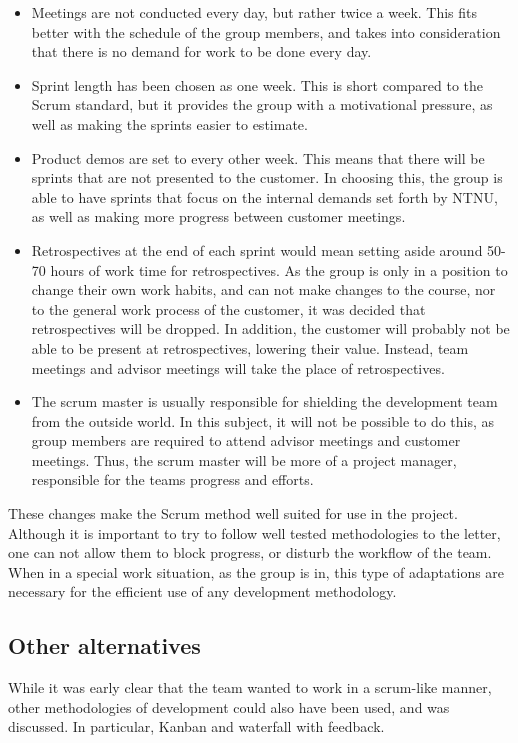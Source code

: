 \documentclass[11pt,a4paper,titlepage,oneside]{report}
\begin{document}
\begin{itemize}
\item Meetings are not conducted every day, but rather twice a week. This fits better with the schedule of the group members, and takes into consideration that there is no demand for work to be done every day. 
\item Sprint length has been chosen as one week. This is short compared to the Scrum standard, but it provides the group with a motivational pressure, as well as making the sprints easier to estimate. 
\item Product demos are set to every other week. This means that there will be sprints that are not presented to the customer. In choosing this, the group is able to have sprints that focus on the internal demands set forth by \gls{NTNU}, as well as making more progress between customer meetings.
\item Retrospectives at the end of each sprint would mean setting aside around 50-70 hours of work time for retrospectives. As the group is only in a position to change their own work habits, and can not make changes to the course, nor to the general work process of the customer, it was decided that retrospectives will be dropped. In addition, the customer will probably not be able to be present at retrospectives, lowering their value. Instead, team meetings and advisor meetings will take the place of retrospectives. 
\item The scrum master is usually responsible for shielding the development team from the outside world. In this subject, it will not be possible to do this, as group members are required to attend advisor meetings and customer meetings. Thus, the scrum master will be more of a project manager, responsible for the teams progress and efforts. 
\end {itemize}

These changes make the Scrum method well suited for use in the project. Although it is important to try to follow well tested methodologies to the letter, one can not allow them to block progress, or disturb the workflow of the team. When in a special work situation, as the group is in, this type of adaptations are necessary for the efficient use of any development methodology. 

\subsection{Other alternatives}
While it was early clear that the team wanted to work in a scrum-like manner, other methodologies of development could also have been used, and was discussed. In particular, Kanban and waterfall with feedback.
\end{document}
